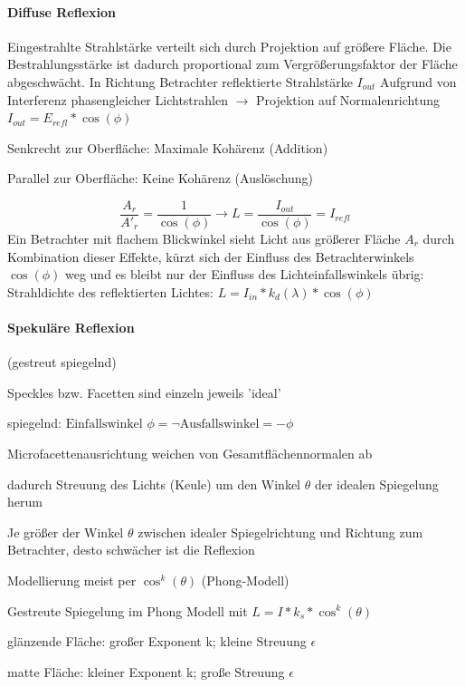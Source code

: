\documentclass[landscape]{article}
\begin{document}
\begin{multicols}{3}
  \paragraph{Diffuse Reflexion}
  Eingestrahlte Strahlstärke verteilt sich durch Projektion auf größere Fläche. Die Bestrahlungsstärke ist dadurch proportional zum Vergrößerungsfaktor der Fläche abgeschwächt.
  In Richtung Betrachter reflektierte Strahlstärke $I_{out}$ Aufgrund von Interferenz phasengleicher Lichtstrahlen $\rightarrow$ Projektion auf Normalenrichtung $I_{out}= E_{refl} * \cos(\phi)$
  \begin{itemize*}
    \item Senkrecht zur Oberfläche: Maximale Kohärenz (Addition)
    \item Parallel zur Oberfläche: Keine Kohärenz (Auslöschung)
  \end{itemize*}
  
  $$\frac{A_r}{A'_r}=\frac{1}{\cos(\phi)} \rightarrow L=\frac{I_{out}}{\cos(\phi)}=I_{refl}$$
  Ein Betrachter mit flachem Blickwinkel sieht Licht aus größerer Fläche $A_r$ durch Kombination dieser Effekte, kürzt sich der Einfluss des Betrachterwinkels $\cos(\phi)$ weg und es bleibt nur der Einfluss des Lichteinfallswinkels übrig: Strahldichte des reflektierten Lichtes: $L=I_{in}*k_d(\lambda)*\cos(\phi)$
  
  \paragraph{Spekuläre Reflexion}
  (gestreut spiegelnd)
  \begin{itemize*}
    \item Speckles bzw. Facetten sind einzeln jeweils 'ideal'
    \item spiegelnd: $\text{Einfallswinkel } \phi = \neg \text{Ausfallswinkel} = -\phi$
    \item Microfacettenausrichtung weichen von Gesamtflächennormalen ab
    \item dadurch Streuung des Lichts (Keule) um den Winkel $\theta$ der idealen Spiegelung herum
    \item Je größer der Winkel $\theta$ zwischen idealer Spiegelrichtung und Richtung zum Betrachter, desto schwächer ist die Reflexion
    \item Modellierung meist per $\cos^k(\theta)$ (Phong-Modell)
  \end{itemize*}
  
  Gestreute Spiegelung im Phong Modell mit $L=I*k_s*\cos^k(\theta)$
  \begin{itemize*}
    \item glänzende Fläche: großer Exponent k; kleine Streuung $\epsilon$
    \item matte Fläche: kleiner Exponent k; große Streuung $\epsilon$
  \end{itemize*}
  

\end{multicols}
\end{document}
